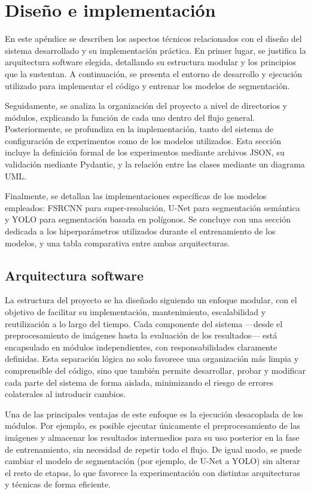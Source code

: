 \documentclass[../main.tex]{subfiles}
\begin{document}
\section{Diseño e implementación}
En este apéndice se describen los aspectos técnicos relacionados con el diseño del sistema desarrollado y su implementación práctica. En primer lugar, se justifica la arquitectura software elegida, detallando su estructura modular y los principios que la sustentan. A continuación, se presenta el entorno de desarrollo y ejecución utilizado para implementar el código y entrenar los modelos de segmentación.

Seguidamente, se analiza la organización del proyecto a nivel de directorios y módulos, explicando la función de cada uno dentro del flujo general. Posteriormente, se profundiza en la implementación, tanto del sistema de configuración de experimentos como de los modelos utilizados. Esta sección incluye la definición formal de los experimentos mediante archivos JSON, su validación mediante Pydantic, y la relación entre las clases mediante un diagrama UML.

Finalmente, se detallan las implementaciones específicas de los modelos empleados: FSRCNN para super-resolución, U-Net para segmentación semántica y YOLO para segmentación basada en polígonos. Se concluye con una sección dedicada a los hiperparámetros utilizados durante el entrenamiento de los modelos, y una tabla comparativa entre ambas arquitecturas.


\subsection{Arquitectura software}
La estructura del proyecto se ha diseñado siguiendo un enfoque modular, con el objetivo de facilitar su implementación, mantenimiento, escalabilidad y reutilización a lo largo del tiempo. Cada componente del sistema —desde el preprocesamiento de imágenes hasta la evaluación de los resultados— está encapsulado en módulos independientes, con responsabilidades claramente definidas. Esta separación lógica no solo favorece una organización más limpia y comprensible del código, sino que también permite desarrollar, probar y modificar cada parte del sistema de forma aislada, minimizando el riesgo de errores colaterales al introducir cambios.

Una de las principales ventajas de este enfoque es la ejecución desacoplada de los módulos. Por ejemplo, es posible ejecutar únicamente el preprocesamiento de las imágenes y almacenar los resultados intermedios para su uso posterior en la fase de entrenamiento, sin necesidad de repetir todo el flujo. De igual modo, se puede cambiar el modelo de segmentación (por ejemplo, de U-Net a YOLO) sin alterar el resto de etapas, lo que favorece la experimentación con distintas arquitecturas y técnicas de forma eficiente.
\end{document}
